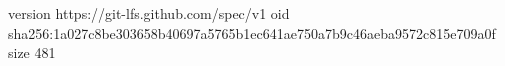 version https://git-lfs.github.com/spec/v1
oid sha256:1a027c8be303658b40697a5765b1ec641ae750a7b9c46aeba9572c815e709a0f
size 481
